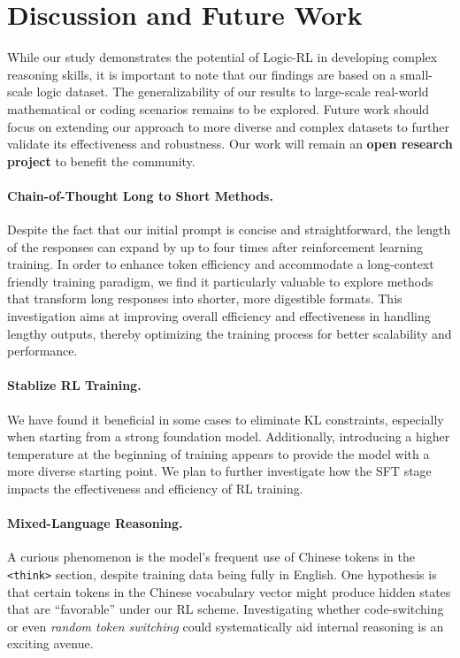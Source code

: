 \section{Discussion and Future Work}
While our study demonstrates the potential of Logic-RL in developing complex reasoning skills, it is important to note that our findings are based on a small-scale logic dataset. The generalizability of our results to large-scale real-world mathematical or coding scenarios remains to be explored. Future work should focus on extending our approach to more diverse and complex datasets to further validate its effectiveness and robustness. Our work will remain an \textbf{open research project} to benefit the community.

\paragraph{Chain-of-Thought Long to Short Methods.}

Despite the fact that our initial prompt is concise and straightforward, the length of the responses can expand by up to four times after reinforcement learning training. In order to enhance token efficiency and accommodate a long-context friendly training paradigm, we find it particularly valuable to explore methods that transform long responses into shorter, more digestible formats. This investigation aims at improving overall efficiency and effectiveness in handling lengthy outputs, thereby optimizing the training process for better scalability and performance.

\paragraph{Stablize RL Training.}

We have found it beneficial in some cases to eliminate KL constraints, especially when starting from a strong foundation model. Additionally, introducing a higher temperature at the beginning of training appears to provide the model with a more diverse starting point. We plan to further investigate how the SFT stage impacts the effectiveness and efficiency of RL training. 


\paragraph{Mixed-Language Reasoning.} 

A curious phenomenon is the model’s frequent use of Chinese tokens in the \texttt{<think>} section, despite training data being fully in English. One hypothesis is that certain tokens in the Chinese vocabulary vector might produce hidden states that are ``favorable'' under our RL scheme. Investigating whether code-switching or even \emph{random token switching} could systematically aid internal reasoning is an exciting avenue.

